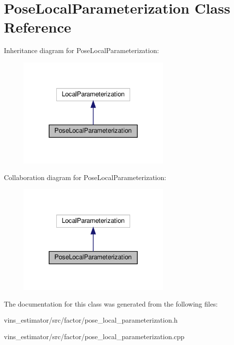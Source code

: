 \hypertarget{classPoseLocalParameterization}{}\section{Pose\+Local\+Parameterization Class Reference}
\label{classPoseLocalParameterization}


Inheritance diagram for Pose\+Local\+Parameterization\+:\nopagebreak
\begin{figure}[H]
\begin{center}
\leavevmode
\includegraphics[width=216pt]{classPoseLocalParameterization__inherit__graph}
\end{center}
\end{figure}


Collaboration diagram for Pose\+Local\+Parameterization\+:\nopagebreak
\begin{figure}[H]
\begin{center}
\leavevmode
\includegraphics[width=216pt]{classPoseLocalParameterization__coll__graph}
\end{center}
\end{figure}


The documentation for this class was generated from the following files\+:\begin{DoxyCompactItemize}
\item 
vins\+\_\+estimator/src/factor/pose\+\_\+local\+\_\+parameterization.\+h\item 
vins\+\_\+estimator/src/factor/pose\+\_\+local\+\_\+parameterization.\+cpp\end{DoxyCompactItemize}
